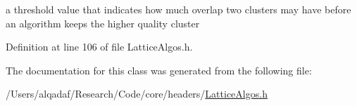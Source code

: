 a threshold value that indicates how much overlap two clusters may have before an algorithm keeps the higher quality cluster 



Definition at line 106 of file LatticeAlgos.h.



The documentation for this class was generated from the following file:\begin{DoxyCompactItemize}
\item 
/Users/alqadaf/Research/Code/core/headers/\hyperlink{_lattice_algos_8h}{LatticeAlgos.h}\end{DoxyCompactItemize}
